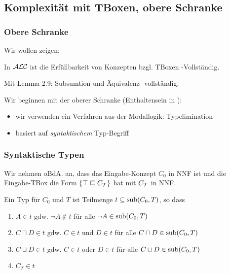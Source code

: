 \subsection{Komplexität mit TBoxen, obere
Schranke}\label{komplexituxe4t-mit-tboxen-obere-schranke}

\subsubsection{Obere Schranke}

Wir wollen zeigen:

\begin{theorem}
In $\mathcal{A}\mathcal{L}\mathcal{C}$ ist die Erfüllbarkeit von Konzepten bzgl. TBoxen
\ExpTime-Vollständig.
\end{theorem}

Mit Lemma 2.9: Subsumtion und Äquivalenz \ExpTime-vollständig.

Wir beginnen mit der oberer Schranke (Enthaltensein in \ExpTime):

\begin{itemize}
  \item wir verwenden ein Verfahren aus der Modallogik: Typelimination
  \item basiert auf \emph{syntaktischem} Typ-Begriff
\end{itemize}

\subsubsection{Syntaktische Typen}\label{synt-typ}

Wir nehmen oBdA. an, dass das Eingabe-Konzept $C_0$ in NNF ist und die Eingabe-TBox die Form $\{\top \sqsubseteq C_{\mathcal{T}}\}$ hat mit $C_{\mathcal{T}}$ in NNF.

\begin{definition}[Typ]

Ein Typ für $C_{0}$ und $T$ ist Teilmenge
$t \subseteq \sub\left( C_{0},T \right)$, so dass

\begin{enumerate}
\item
  $A \in t$ gdw. $\neg A \notin t$ für alle
  $\neg A \in \sub\left( C_{0},T \right)$
\item
  $C \sqcap D \in t$ gdw. $C \in t$ und $D \in t$ für alle
  $C \sqcap D \in \sub\left( C_{0},T \right)$
\item
  $C \sqcup D \in t$ gdw. $C \in t$ oder $D \in t$ für alle
  $C \sqcup D \in \sub\left( C_{0},T \right)$
\item
  $C_{T} \in t$
\end{enumerate}
\end{definition}

